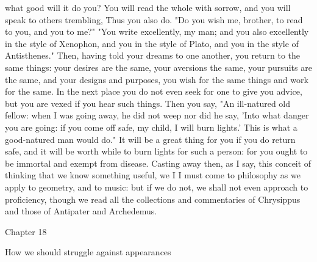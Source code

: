 \documentclass[a4paper]{article}
\begin{document}
what good will it do you? You will read the whole with sorrow, and you will
speak to others trembling, Thus you also do. "Do you wish me, brother, to read
to you, and you to me?" "You write excellently, my man; and you also
excellently in the style of Xenophon, and you in the style of Plato, and you in
the style of Antisthenes." Then, having told your dreams to one another, you
return to the same things: your desires are the same, your aversions the same,
your pursuits are the same, and your designs and purposes, you wish for the
same things and work for the same. In the next place you do not even seek for
one to give you advice, but you are vexed if you hear such things. Then you
say, "An ill-natured old fellow: when I was going away, he did not weep nor did
he say, 'Into what danger you are going: if you come off safe, my child, I will
burn lights.' This is what a good-natured man would do." It will be a great
thing for you if you do return safe, and it will be worth while to burn lights
for such a person: for you ought to be immortal and exempt from disease.
    Casting away then, as I say, this conceit of thinking that we know
something useful, we I I must come to philosophy as we apply to geometry, and
to music: but if we do not, we shall not even approach to proficiency, though
we read all the collections and commentaries of Chrysippus and those of
Antipater and Archedemus.

Chapter 18

How we should struggle against appearances
\end{document}
